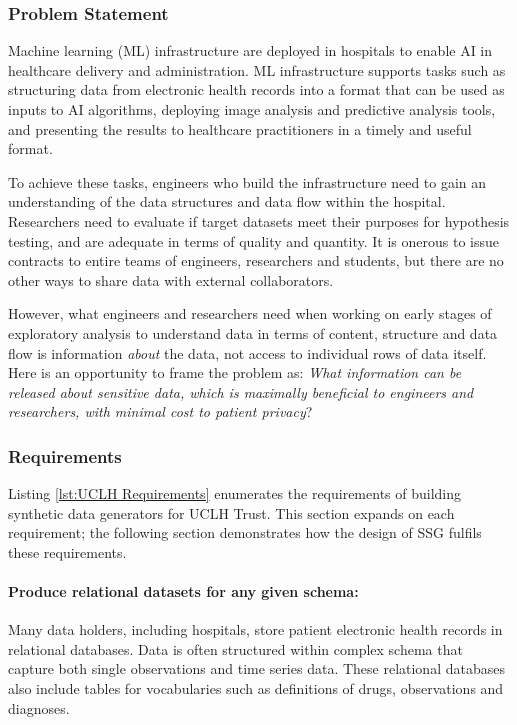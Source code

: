 \documentclass[11pt]{article}
\begin{document}
\subsubsection{Problem Statement}

Machine learning (ML) infrastructure are deployed in hospitals to enable AI in healthcare delivery and administration. ML infrastructure supports tasks such as structuring data from electronic health records into a format that can be used as inputs to AI algorithms, deploying image analysis and predictive analysis tools, and presenting the results to healthcare practitioners in a timely and useful format.

To achieve these tasks, engineers who build the infrastructure need to gain an understanding of the data structures and data flow within the hospital. Researchers need to evaluate if target datasets meet their purposes for hypothesis testing, and are adequate in terms of quality and quantity. It is onerous to issue contracts to entire teams of engineers, researchers and students, but there are no other ways to share data with external collaborators. 

However, what engineers and researchers need when working on early stages of exploratory analysis to  understand data in terms of content, structure and data flow is information \emph{about} the data, not access to individual rows of data itself. Here is an  opportunity to frame the problem as: \emph{What information can be released about sensitive data, which is maximally beneficial to engineers and researchers, with minimal cost to patient privacy}?

\subsubsection{Requirements}

Listing \ref{lst:UCLH Requirements} enumerates the requirements of building synthetic data generators for UCLH Trust. This section expands on each requirement; the following section demonstrates how the design of SSG fulfils these requirements.

\paragraph{Produce relational datasets for any given schema:}

Many data holders, including hospitals, store patient electronic health records in relational databases. Data is often structured within complex schema that capture both single observations and time series data. These relational databases also include tables for vocabularies such as definitions of drugs, observations and diagnoses. 
\end{document}
